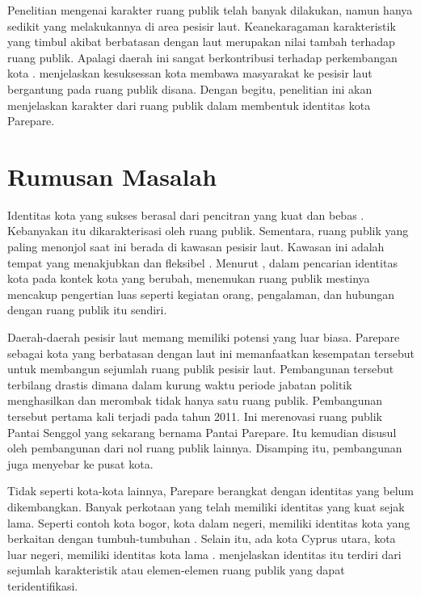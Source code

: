 \documentclass[12pt]{simart} %
\begin{document}
Penelitian mengenai karakter ruang publik telah banyak dilakukan, namun hanya sedikit yang melakukannya di area pesisir laut. Keanekaragaman karakteristik yang timbul akibat berbatasan dengan laut merupakan nilai tambah terhadap ruang publik. Apalagi daerah ini sangat berkontribusi terhadap perkembangan kota \citep{hussein2014}. \cite{hussein2014} menjelaskan kesuksessan kota membawa masyarakat ke pesisir laut bergantung pada ruang publik disana. Dengan begitu, penelitian ini akan menjelaskan karakter dari ruang publik dalam membentuk identitas kota Parepare.

\section{Rumusan Masalah}

Identitas kota yang sukses berasal dari pencitran yang kuat dan bebas \citep{oktay2002}. Kebanyakan itu dikarakterisasi oleh ruang publik. Sementara, ruang publik yang paling menonjol saat ini berada di kawasan pesisir laut.
Kawasan ini adalah tempat yang menakjubkan dan fleksibel \citep{hussein2014}. Menurut \cite{oktay2002}, dalam pencarian identitas kota pada kontek kota yang berubah, menemukan ruang publik mestinya mencakup pengertian luas seperti kegiatan orang, pengalaman, dan hubungan dengan ruang publik itu sendiri.

Daerah-daerah pesisir laut memang memiliki potensi yang luar biasa. Parepare sebagai kota yang berbatasan dengan laut ini memanfaatkan kesempatan tersebut untuk membangun sejumlah ruang publik pesisir laut.
Pembangunan tersebut terbilang drastis dimana dalam kurung waktu periode jabatan politik menghasilkan dan merombak tidak hanya satu ruang publik. Pembangunan tersebut pertama kali terjadi pada tahun 2011. Ini merenovasi ruang publik Pantai Senggol yang sekarang bernama Pantai Parepare. Itu kemudian disusul oleh pembangunan dari nol ruang publik lainnya. Disamping itu, pembangunan juga menyebar ke pusat kota.

Tidak seperti kota-kota lainnya, Parepare berangkat dengan identitas yang belum dikembangkan. Banyak perkotaan yang telah memiliki identitas yang kuat sejak lama. Seperti contoh kota bogor, kota dalam negeri, memiliki identitas kota yang berkaitan dengan tumbuh-tumbuhan \citep{hartanti2014}. Selain itu, ada kota Cyprus utara, kota luar negeri, memiliki identitas kota lama \citep{oktay2002}. \cite{oktay2002} menjelaskan identitas itu terdiri dari sejumlah karakteristik atau elemen-elemen ruang publik yang dapat teridentifikasi.
\end{document}

